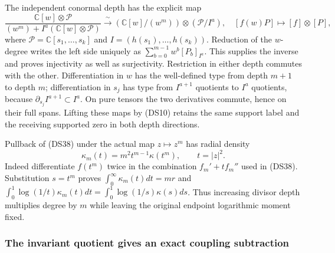 The independent conormal depth has the explicit map
\[
 \frac{\mathbb C[w]\otimes\mathcal P}
 {(w^m)+I^a(\mathbb C[w]\otimes\mathcal P)}
 \xrightarrow{\ \sim\ }
 (\mathbb C[w]/(w^m))\otimes(\mathcal P/I^a),
 \quad [f(w)P]\mapsto[f]\otimes[P],
 \tag{DS51}
\]
where $\mathcal P=\mathbb C[s_1,\ldots,s_k]$ and
$I=(h(s_1),\ldots,h(s_k))$.  Reduction of the $w$-degree writes
the left side uniquely as $\sum_{b=0}^{m-1}w^b[P_b]_{I^a}$.
This supplies the inverse and proves injectivity as well as
surjectivity.  Restriction in either depth commutes with the other.
Differentiation in $w$ has the well-defined type from depth $m+1$
to depth $m$; differentiation in $s_j$ has type from $I^{a+1}$
quotients to $I^a$ quotients, because
$\partial_{s_j}I^{a+1}\subset I^a$.  On pure tensors the two
derivatives commute, hence on their full spans.  Lifting these maps
by (DS10) retains the same support label and the receiving supported
zero in both depth directions.

Pullback of (DS38) under the actual map $z\mapsto z^m$ has radial
density
\[
 \kappa_m(t)=m^2t^{m-1}\kappa(t^m),\qquad t=|z|^2.
 \tag{DS52}
\]
Indeed differentiate $f(t^m)$ twice in the combination
$f_m'+tf_m''$ used in (DS38).  Substitution $s=t^m$ proves
$\int_0^\infty\kappa_m(t)dt=mr$ and
$\int_0^1\log(1/t)\kappa_m(t)dt
=\int_0^1\log(1/s)\kappa(s)ds$.
Thus increasing divisor depth multiplies degree by $m$ while
leaving the original endpoint logarithmic moment fixed.

\subsubsection{The invariant quotient gives an exact coupling subtraction}

